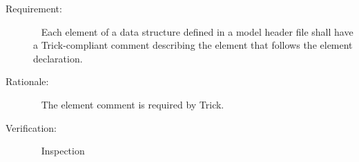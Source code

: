 \documentclass[twoside,11pt,titlepage]{report}
\begin{document}
\label{reqt:struct_trick_comments}
\begin{description}
  \item[Requirement:]\ \newline
    Each element of a data structure defined in a model header
    file shall have a Trick-compliant comment describing the
    element that follows the element declaration.

  \item[Rationale:]\ \newline
    The element comment is required by Trick.

  \item[Verification:]\ \newline
    Inspection
\end{description}
\end{document}
